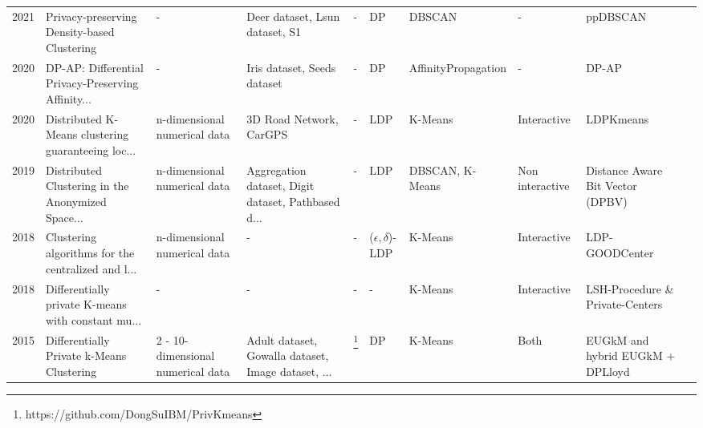 \begin{landscape}
\begin{table}[ht]
\begin{adjustbox}{width=1.6\textwidth}
\begin{tabular}{rlllllllll}
        2021 \citep{bozdemir_privacy-preserving_nodate} & Privacy-preserving Density-based Clustering        & -                                 & Deer dataset, Lsun dataset, S1                     & -                                                  & DP                       & DBSCAN              & -               & ppDBSCAN                         \\
        2020 \citep{cai_dp-ap_2020}                     & DP-AP: Differential Privacy-Preserving Affinity... & -                                 & Iris dataset, Seeds dataset                        & -                                                  & DP                       & AffinityPropagation & -               & DP-AP                            \\
        2020 \citep{xia_distributed_2020}               & Distributed K-Means clustering guaranteeing loc... & n-dimensional numerical data      & 3D Road Network, CarGPS                            & -                                                  & LDP                      & K-Means             & Interactive     & LDPKmeans                        \\
        2019 \citep{sun_distributed_2019}               & Distributed Clustering in the Anonymized Space...  & n-dimensional numerical data      & Aggregation dataset, Digit dataset, Pathbased d... & -                                                  & LDP                      & DBSCAN, K-Means     & Non interactive & Distance Aware Bit Vector (DPBV) \\
        2018 \citep{nissim_clustering_2018}             & Clustering algorithms for the centralized and l... & n-dimensional numerical data      & -                                                  & -                                                  & ($\epsilon, \delta$)-LDP & K-Means             & Interactive     & LDP-GOODCenter                   \\
        2018 \citep{nissim_clustering_2018}             & Differentially private K-means with constant mu... & -                                 & -                                                  & -                                                  & -                        & K-Means             & Interactive     & LSH-Procedure \& Private-Centers \\
        2015 \citep{su_differentially_2015}             & Differentially Private k-Means Clustering          & 2 - 10-dimensional numerical data & Adult dataset, Gowalla dataset, Image dataset, ... & \footnote{https://github.com/DongSuIBM/PrivKmeans} & DP                       & K-Means             & Both            & EUGkM and hybrid EUGkM + DPLloyd \\

\end{tabular}
\end{adjustbox}
\end{table}
\end{landscape}
